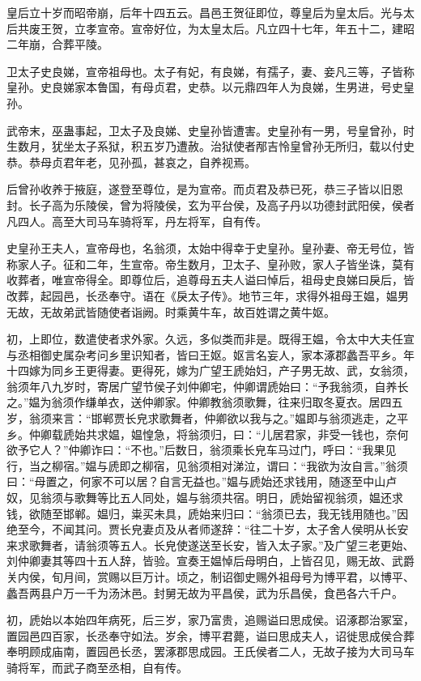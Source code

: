 \documentclass[]{article}
\begin{document}
皇后立十岁而昭帝崩，后年十四五云。昌邑王贺征即位，尊皇后为皇太后。光与太后共废王贺，立孝宣帝。宣帝好位，为太皇太后。凡立四十七年，年五十二，建昭二年崩，合葬平陵。

卫太子史良娣，宣帝祖母也。太子有妃，有良娣，有孺子，妻、妾凡三等，子皆称皇孙。史良娣家本鲁国，有母贞君，史恭。以元鼎四年人为良娣，生男进，号史皇孙。

武帝末，巫蛊事起，卫太子及良娣、史皇孙皆遭害。史皇孙有一男，号皇曾孙，时生数月，犹坐太子系狱，积五岁乃遭赦。治狱使者邴吉怜皇曾孙无所归，载以付史恭。恭母贞君年老，见孙孤，甚哀之，自养视焉。

后曾孙收养于掖庭，遂登至尊位，是为宣帝。而贞君及恭已死，恭三子皆以旧恩封。长子高为乐陵侯，曾为将陵侯，玄为平台侯，及高子丹以功德封武阳侯，侯者凡四人。高至大司马车骑将军，丹左将军，自有传。

史皇孙王夫人，宣帝母也，名翁须，太始中得幸于史皇孙。皇孙妻、帝无号位，皆称家人子。征和二年，生宣帝。帝生数月，卫太子、皇孙败，家人子皆坐诛，莫有收葬者，唯宣帝得全。即尊位后，追尊母五夫人谥曰悼后，祖母史良娣曰戾后，皆改葬，起园邑，长丞奉守。语在《戾太子传》。地节三年，求得外祖母王媪，媪男无故，无故弟武皆随使者诣阙。时乘黄牛车，故百姓谓之黄牛妪。

初，上即位，数遣使者求外家。久远，多似类而非是。既得王媪，令太中大夫任宣与丞相御史属杂考问乡里识知者，皆曰王妪。妪言名妄人，家本涿郡蠡吾平乡。年十四嫁为同乡王更得妻。更得死，嫁为广望王虒始妇，产子男无故、武，女翁须，翁须年八九岁时，寄居广望节侯子刘仲卿宅，仲卿谓虒始曰：``予我翁须，自养长之。''媪为翁须作缣单衣，送仲卿家。仲卿教翁须歌舞，往来归取冬夏衣。居四五岁，翁须来言：``邯郸贾长皃求歌舞者，仲卿欲以我与之。''媪即与翁须逃走，之平乡。仲卿载虒始共求媪，媪惶急，将翁须归，曰：``儿居君家，非受一钱也，奈何欲予它人？''仲卿诈曰：``不也。''后数日，翁须乘长皃车马过门，呼曰：``我果见行，当之柳宿。''媪与虒即之柳宿，见翁须相对涕泣，谓曰：``我欲为汝自言。''翁须曰：``母置之，何家不可以居？自言无益也。''媪与虒始还求钱用，随逐至中山卢奴，见翁须与歌舞等比五人同处，媪与翁须共宿。明日，虒始留视翁须，媪还求钱，欲随至邯郸。媪归，粜买未具，虒始来归曰：``翁须已去，我无钱用随也。''因绝至今，不闻其问。贾长皃妻贞及从者师遂辞：``往二十岁，太子舍人侯明从长安来求歌舞者，请翁须等五人。长皃使遂送至长安，皆入太子家。''及广望三老更始、刘仲卿妻其等四十五人辞，皆验。宣奏王媪悼后母明白，上皆召见，赐无故、武爵关内侯，旬月间，赏赐以巨万计。顷之，制诏御史赐外祖母号为博平君，以博平、蠡吾两县户万一千为汤沐邑。封舅无故为平昌侯，武为乐昌侯，食邑各六千户。

初，虒始以本始四年病死，后三岁，家乃富贵，追赐谥曰思成侯。诏涿郡治冢室，置园邑四百家，长丞奉守如法。岁余，博平君薨，谥曰思成夫人，诏徙思成侯合葬奉明顾成庙南，置园邑长丞，罢涿郡思成园。王氏侯者二人，无故子接为大司马车骑将军，而武子商至丞相，自有传。
\end{document}
